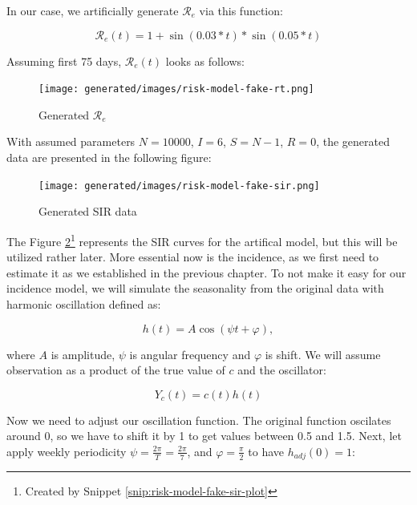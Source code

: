\documentclass[
  digital, %
  oneside, %
  lof,     %
  lot,     %
]{fithesis4}
\begin{document}
\noindent
In our case, we artificially generate $\mathcal{R}_{e}$ via this function:

\begin{equation}
  \mathcal{R}_{e}(t) = 1 + \sin (0.03 * t) * \sin (0.05 * t)
\end{equation}

Assuming first 75 days, $\mathcal{R}_{e}(t)$ looks as follows:

\begin{figure}[H]
  \begin{center}
    \texttt{[image: generated/images/risk-model-fake-rt.png]}
  \end{center}
  \caption{Generated $\mathcal{R}_{e}$}
  \label{fig:risk-model-fake-rt}
\end{figure}

With assumed parameters $N = 10000$, $I = 6$, $S = N - 1$, $R = 0$, the generated data are presented in the following figure:

\begin{figure}[H]
  \begin{center}
    \texttt{[image: generated/images/risk-model-fake-sir.png]}
  \end{center}
  \caption{Generated SIR data}
  \label{fig:risk-model-fake-sir}
\end{figure}

The Figure \ref{fig:risk-model-fake-sir}\footnote{Created by Snippet \ref{snip:risk-model-fake-sir-plot}} represents the SIR curves for the artifical model, but this will be utilized rather later.
More essential now is the incidence, as we first need to estimate it as we established in the previous chapter.
To not make it easy for our incidence model, we will simulate the seasonality from the original data with harmonic oscillation defined as:

\begin{equation}
  h(t) = A \cos(\psi t + \varphi),
\end{equation}

where $A$ is amplitude, $\psi$ is angular frequency and $\varphi$ is shift.
We will assume observation as a product of the true value of $c$
and the oscillator:

\begin{equation}
  Y_{c}(t) = c(t) h(t)
\end{equation}

Now we need to adjust our oscillation function.
The original function oscilates around 0, so we have to shift it by 1 to get values between 0.5 and 1.5.
Next, let apply weekly periodicity $\psi = \frac{2 \pi}{T} = \frac{2 \pi}{7}$, and $\varphi = \frac{\pi}{2}$ to have $h_{adj}(0) = 1$:
\end{document}
